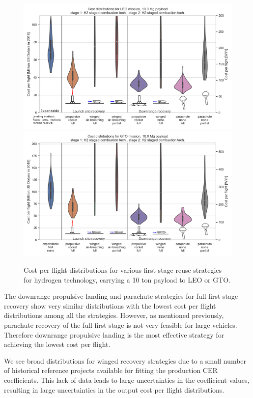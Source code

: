 \documentclass[conf]{new-aiaa}
\begin{document}
\begin{multicols}{2}
\begin{figure}
    \centering
    \includegraphics[width=\textwidth]{strategy_cost_annotated/LEO_H2}
     \includegraphics[width=\textwidth]{strategy_cost_annotated/GTO_H2}
    \caption{\label{fig:strategy_cost_LEO_H2} Cost per flight distributions for various first stage reuse strategies for hydrogen technology, carrying a 10 ton payload to LEO or GTO.}
\end{figure}

The downrange propulsive landing and parachute strategies for full first stage recovery show very similar distributions with the lowest cost per flight distributions among all the strategies. However, as mentioned previously, parachute recovery of the full first stage is not very feasible for large vehicles. Therefore downrange propulsive landing is the most effective strategy for achieving the lowest cost per flight. 

We see broad distributions for winged recovery strategies due to a small number of historical reference projects available for fitting the production CER coefficients. This lack of data leads to large uncertainties in the coefficient values, resulting in large uncertainties in the output cost per flight distributions. 


\end{multicols}
\end{document}
